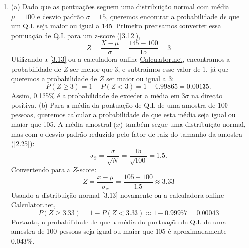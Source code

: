 \begin{enumerate}[label=\textbf{3.\arabic*.}]
	\item (a) Dado que as pontuações seguem uma distribuição normal com média $\mu = 100$ e desvio padrão $\sigma = 15$, queremos encontrar a probabilidade de que um Q.I. seja maior ou igual a 145. Primeiro precisamos converter essa pontuação de Q.I. para um z-score (\autoref{3.12}), 
	\begin{equation*}
	Z = \dfrac{X - \mu}{\sigma} = \dfrac{145 - 100}{15} = 3
	\end{equation*}
	 Utilizando a \autoref{3.13} ou a calculadora online \href{https://www.calculator.net/z-score-calculator.html?c1raw=145&c1mean=100&c1sd=15&calctype=zscore&x=Calculate}{Calculator.net}, encontramos a probabilidade de $Z$ ser menor que 3, e subtraímos esse valor de 1, já que queremos a probabilidade de $Z$ ser maior ou igual a 3:
	\begin{equation*}
	P(Z \geq 3) = 1 - P(Z < 3) = 1 - 0.99865 = 0.00135.
	\end{equation*} 
	Assim, 0.135\% é a probabilidade de exceder a média em $3\sigma$ na direção positiva. (b) Para a média da pontuação de Q.I. de uma amostra de 100 pessoas, queremos calcular a probabilidade de que esta média seja igual ou maior que 105. A média amostral ($\bar{x}$) também segue uma distribuição normal, mas com o desvio padrão reduzido pelo fator de raiz do tamanho da amostra (\autoref{2.25}):
	\begin{equation*}
	\sigma_{\overline{x}} = \dfrac{\sigma}{\sqrt{N}} = \dfrac{15}{\sqrt{100}} = 1.5.
	\end{equation*}
	Convertendo para a $Z$-score:
	\begin{equation*}
	Z = \dfrac{\overline{x} - \mu}{\sigma_{\overline{x}}} = \dfrac{105 - 100}{1.5} \approx 3.33
	\end{equation*}
	Usando a distribuição normal \autoref{3.13} novamente ou a calculadora online \href{https://www.calculator.net/z-score-calculator.html?c1raw=105&c1mean=100&c1sd=1.5&calctype=zscore&x=Calculate}{Calculator.net},
	\begin{equation*}
	P(Z \geq 3.33) = 1 - P(Z < 3.33) \approx 1 - 0.99957 = 0.00043
	\end{equation*}
	Portanto, a probabilidade de que a média da pontuação de Q.I. de uma amostra de 100 pessoas seja igual ou maior que 105 é aproximadamente 0.043\%.
	

\end{enumerate}
